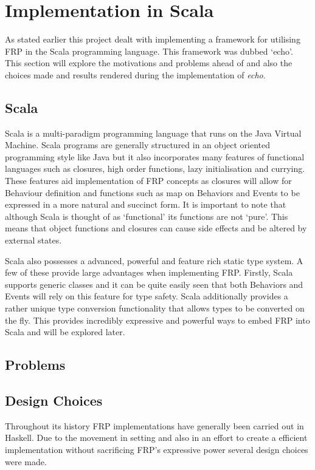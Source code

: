 \documentclass[12pt]{article}
\begin{document}
  \section{Implementation in Scala}
    As stated earlier this project dealt with implementing a framework for utilising FRP in the Scala programming
    language. This framework was dubbed `echo'. This section will explore the motivations and problems ahead of
    and also the choices made and results rendered during the implementation of \emph{echo}.
    
    \subsection{Scala}
      Scala is a multi-paradigm programming language that runs on the Java Virtual Machine. Scala programs are
      generally structured in an object oriented programming style like Java but it also incorporates many features of
      functional languages such as closures, high order functions, lazy initialisation and currying. These features aid
      implementation of FRP concepts as closures will allow for Behaviour definition and functions such as map on
      Behaviors and Events to be expressed in a more natural and succinct form. It is
      important to note that although Scala is thought of as `functional' its functions are not `pure'. This means
      that object functions and closures can cause side effects and be altered by external states.
      
      Scala also possesses a advanced, powerful and feature rich static type system. A few of these provide large
      advantages when implementing FRP. Firstly, Scala supports generic classes and it can be quite easily seen
      that both Behaviors and Events will rely on this feature for type safety. Scala additionally provides
      a rather unique type conversion functionality that allows types to be converted on the fly. This provides
      incredibly expressive and powerful ways to embed FRP into Scala and will be explored later.
      
    \subsection{Problems}
    
    \subsection{Design Choices}
    Throughout its history FRP implementations have generally been carried out in Haskell. Due to the movement
    in setting and also in an effort to create a efficient implementation without sacrificing FRP's expressive power
    several design choices were made. 
    
\end{document}

